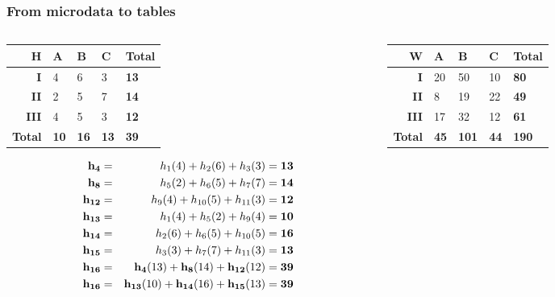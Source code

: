  
\begin{frame}\frametitle{From microdata to tables}
	\begin{columns}
	\begin{column}{5cm}
		\begin{center}
			\begin{tabular}{|r|lll|l|}
			\hline
			{\bf H} & {\bf A} & {\bf B} & {\bf C} & {\bf Total} \\ 
			\hline
			{\bf I} 	& 4 & 6 & 3 & {\bf 13} \\ 
			{\bf II} 	& 2 & 5 & 7 & {\bf 14}\\ 
			{\bf III} & 4 & 5 & 3 & {\bf 12}\\ 
			\hline
			{\bf Total} & {\bf 10} & {\bf 16} & {\bf 13} & {\bf 39} \\
			\hline
			\end{tabular}
		\end{center}	
		
		\begin{scriptsize}
		\begin{eqnarray*}		
			\mathbf{h_4} 	 &=& h_1 (4) + h_2 (6) + h_3 (3) = \textbf{13} \\
			\mathbf{h_8} 	 &=& h_5 (2) + h_6 (5) + h_7 (7) = \textbf{14} \\
			\mathbf{h_{12}} &=& h_9 (4) + h_{10} (5) + h_{11} (3) = \textbf{12} \\			
			\mathbf{h_{13}} &=& h_1 (4) + h_5 (2) + h_9 (4) = \textbf{10} \\
			\mathbf{h_{14}} &=& h_2 (6) + h_6 (5) + h_{10} (5) = \textbf{16} \\
			\mathbf{h_{15}} &=& h_3 (3) + h_7 (7) + h_{11} (3) = \textbf{13} \\				
			\mathbf{h_{16}} &=& \mathbf{h_4} (13) + \mathbf{h_8} (14) + \mathbf{h_{12}} (12) =
			\textbf{39} \\ 
			\mathbf{h_{16}} &=& \mathbf{h_{13}} (10) + \mathbf{h_{14}} (16) + \mathbf{h_{15}} (13) =
			\textbf{39}
		\end{eqnarray*}					
		\end{scriptsize}
			
	\end{column}
	\begin{column}{5cm}
		\begin{center}
			\begin{tabular}{|r|lll|l|}
			\hline
			{\bf W} & {\bf A} & {\bf B} & {\bf C} & {\bf Total} \\ 
			\hline
			{\bf I} 	& 20 & 50 & 10 & {\bf 80} \\ 
			{\bf II} 	& 8 & 19 & 22 & {\bf 49} \\ 
			{\bf III} & 17 & 32 & 12 & {\bf 61} \\ 
			\hline
			{\bf Total} & {\bf 45} & {\bf 101} & {\bf 44} & {\bf 190} \\
			\hline
			\end{tabular}		
		\end{center}			


\end{column}
\end{columns}
\end{frame}
